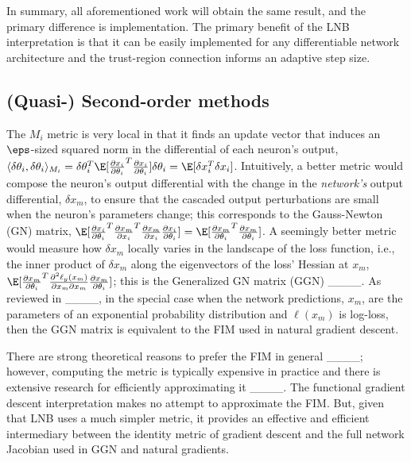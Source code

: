 In summary, all aforementioned work will obtain the same result, and the primary difference
is implementation. The primary benefit of the LNB interpretation is that it can be easily
implemented for any differentiable network architecture and the trust-region connection
informs an adaptive step size.

\subsection{(Quasi-) Second-order methods}
The $M_i$ metric is very local in that it finds
an update vector that induces an $\eps$-sized squared norm in the differential of each neuron's output,
$\langle \delta\theta_i, \delta\theta_i \rangle_{M_i} =
\delta\theta_i^T \E[\frac{\partial x_i}{\partial \theta_i}^T\frac{\partial x_i}{\partial \theta_i}] \delta\theta_i
= \E[\delta x_i^T \delta x_i]$.
Intuitively, a better metric would compose the neuron's output differential with the change in the \emph{network's}
output differential, $\delta x_m$, to ensure that the cascaded output perturbations are small when the neuron's parameters
change; this corresponds to the Gauss-Newton (GN) matrix,
$\E[\frac{\partial x_i}{\partial \theta_i}^T \frac{\partial x_m}{\partial x_i}^T\frac{\partial x_m}{\partial x_i} \frac{\partial x_i}{\partial \theta_i}]
= \E[\frac{\partial x_m}{\partial \theta_i}^T\frac{\partial x_m}{\partial \theta_i}]$.
A seemingly better metric would measure how $\delta x_m$ locally varies in the landscape
of the loss function, i.e., the inner product of $\delta x_m$ along the eigenvectors of the 
loss' Hessian at $x_m$,
$\E[\frac{\partial x_m}{\partial \theta_i}^T \frac{\partial^2 \ell_y(x_m)}{\partial x_m \partial x_m}  \frac{\partial x_m}{\partial \theta_i}]$;
this is the Generalized GN matrix (GGN) ____.
As reviewed in ____,
in the special case when the network predictions, $x_m$, are the parameters of an exponential probability
distribution and $\ell(x_m)$ is log-loss, then the GGN matrix is equivalent to the FIM used in
natural gradient descent.

There are strong theoretical reasons to prefer the FIM in general
____; however,
computing the metric is typically expensive in practice and there is
extensive research for efficiently approximating it
____.
The functional gradient descent interpretation makes no attempt to approximate the FIM.
But, given that LNB uses a much simpler metric, it
provides an effective and efficient intermediary between the identity metric of gradient descent
and the full network Jacobian used in GGN and natural gradients.